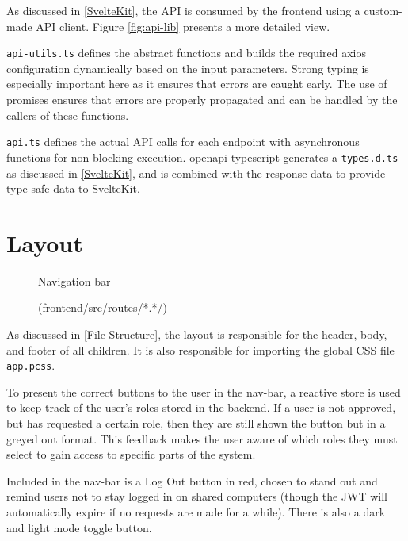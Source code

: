 As discussed in \ref{SvelteKit}, the API is consumed by the frontend using a custom-made API client. Figure \ref{fig:api-lib} presents a more detailed view. 

\texttt{api-utils.ts} defines the abstract functions and builds the required axios configuration dynamically based on the input parameters. Strong typing is especially important here as it ensures that errors are caught early. The use of promises ensures that errors are properly propagated and can be handled by the callers of these functions.

\texttt{api.ts} defines the actual API calls for each endpoint with asynchronous functions for non-blocking execution. openapi-typescript generates a \texttt{types.d.ts} as discussed in \ref{SvelteKit}, and is combined with the response data to provide type safe data to SvelteKit.

\section{Layout}
\begin{figure}[h]
\centering
\caption{Navigation bar}
\vspace{-10pt}
\caption*{(frontend/src/routes/*.*/)}
\vspace{-5pt}
\label{fig:nav}
\vspace{-20pt}
\end{figure}
As discussed in \ref{File Structure}, the layout is responsible for the header, body, and footer of all children. It is also responsible for importing the global CSS file \texttt{app.pcss}. 

To present the correct buttons to the user in the nav-bar, a reactive store is used to keep track of the user's roles stored in the backend. If a user is not approved, but has requested a certain role, then they are still shown the button but in a greyed out format. This feedback makes the user aware of which roles they must select to gain access to specific parts of the system.

Included in the nav-bar is a Log Out button in red, chosen to stand out and remind users not to stay logged in on shared computers (though the JWT will automatically expire if no requests are made for a while). There is also a dark and light mode toggle button.

